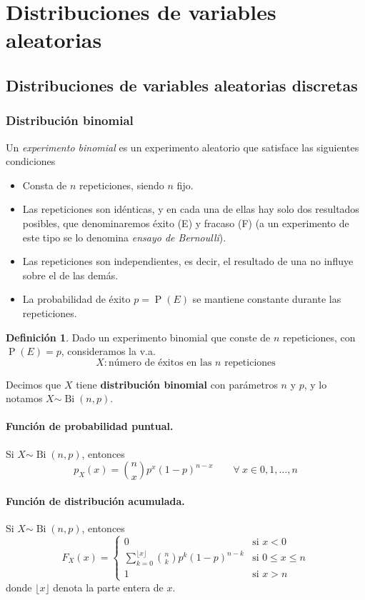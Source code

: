 \documentclass[11pt]{article}
\theoremstyle{plain}
\theoremstyle{definition}
\newtheorem*{defi}{Definición}
\theoremstyle{remark}
\newcommand{\deft}[1]{\textbf{#1}}  %
\newcommand{\proba}{\ensuremath{\operatorname{P}}}  %
\newcommand{\foralle}{\ensuremath{\forall \ }}  %
\newcommand{\dist}[1]{\ensuremath{\sim \operatorname{#1}}}  %
\begin{document}
\section{Distribuciones de variables aleatorias}

  \subsection{Distribuciones de variables aleatorias discretas}

    \subsubsection{Distribución binomial}

      Un \emph{experimento binomial} es un experimento aleatorio que satisface las siguientes condiciones
      \begin{itemize}
        \item Consta de $n$ repeticiones, siendo $n$ fijo.
        \item Las repeticiones son idénticas, y en cada una de ellas hay solo dos resultados posibles, que denominaremos éxito (E) y fracaso (F) (a un experimento de este tipo se lo denomina \emph{ensayo de Bernoulli}).
        \item Las repeticiones son independientes, es decir, el resultado de una no influye sobre el de las demás.
        \item La probabilidad de éxito $p = \proba(E)$ se mantiene constante durante las repeticiones.
      \end{itemize}

      \begin{defi}
        Dado un experimento binomial que conste de $n$ repeticiones, con $\proba(E) = p$, consideramos la v.a.
        \[ X : \text{número de éxitos en las $n$ repeticiones} \]

        Decimos que $X$ tiene \deft{distribución binomial} con parámetros $n$ y $p$, y lo notamos $X \dist{Bi}(n, p)$.
      \end{defi}

      \paragraph{Función de probabilidad puntual.}
      Si $X \dist{Bi}(n,p)$, entonces
      \[ p_X(x) = \binom{n}{x} p^x (1 - p)^{n - x} \qquad \foralle x \in {0, 1, \dots, n} \]

      \paragraph{Función de distribución acumulada.}
      Si $X \dist{Bi}(n,p)$, entonces
      \[ F_X(x) = \begin{cases}
        0 & \text{si $x < 0$} \\
        \displaystyle \sum_{k = 0}^{\lfloor x \rfloor} \binom{n}{k} p^k (1 - p)^{n - k} & \text{si $0 \leq x \leq n$} \\
        1 & \text{si $x > n$}
      \end{cases}  \]
      donde $\lfloor x \rfloor$ denota la parte entera de $x$.
\end{document}
